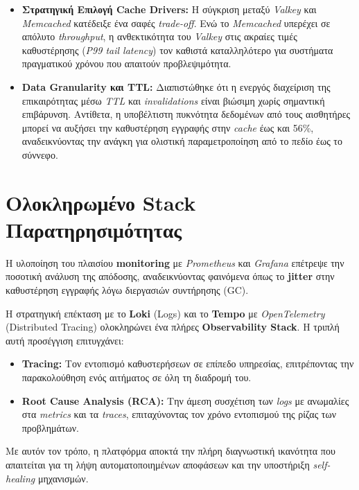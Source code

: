\begin{itemize}
	\item \textbf{Στρατηγική Επιλογή Cache Drivers:} Η σύγκριση μεταξύ
	      \textit{Valkey} και \textit{Memcached} κατέδειξε ένα σαφές
	      \textit{trade-off}. Ενώ το \textit{Memcached} υπερέχει σε
	      απόλυτο \textit{throughput}, η ανθεκτικότητα του
	      \textit{Valkey} στις ακραίες τιμές καθυστέρησης (\textit{P99
		      tail latency}) τον καθιστά καταλληλότερο για συστήματα
	      πραγματικού χρόνου που απαιτούν προβλεψιμότητα.
	\item \textbf{Data Granularity και TTL:} Διαπιστώθηκε ότι η ενεργός
	      διαχείριση της επικαιρότητας μέσω \textit{TTL} και
	      \textit{invalidations} είναι βιώσιμη χωρίς σημαντική
	      επιβάρυνση. Αντίθετα, η υποβέλτιστη πυκνότητα δεδομένων από
	      τους αισθητήρες μπορεί να αυξήσει την καθυστέρηση εγγραφής στην
	      \textit{cache} έως και 56\%, αναδεικνύοντας την ανάγκη για
	      ολιστική παραμετροποίηση από το πεδίο έως το σύννεφο.
\end{itemize}

\section{Ολοκληρωμένο Stack Παρατηρησιμότητας}

Η υλοποίηση του πλαισίου \textbf{monitoring} με \textit{Prometheus} και
\textit{Grafana} επέτρεψε την ποσοτική ανάλυση της απόδοσης, αναδεικνύοντας
φαινόμενα όπως το \textbf{jitter} στην καθυστέρηση εγγραφής λόγω διεργασιών
συντήρησης (GC).

Η στρατηγική επέκταση με το \textbf{Loki} (Logs) και το \textbf{Tempo} με
\textit{OpenTelemetry} (Distributed Tracing) ολοκληρώνει ένα πλήρες
\textbf{Observability Stack}. Η τριπλή αυτή προσέγγιση επιτυγχάνει:
\begin{itemize} \item \textbf{Tracing:} Τον εντοπισμό καθυστερήσεων σε επίπεδο
	      υπηρεσίας, επιτρέποντας την παρακολούθηση ενός αιτήματος σε όλη τη διαδρομή
	      του. \item \textbf{Root Cause Analysis (RCA):} Την άμεση συσχέτιση των
	      \textit{logs} με ανωμαλίες στα \textit{metrics} και τα \textit{traces},
	      επιταχύνοντας τον χρόνο εντοπισμού της ρίζας των προβλημάτων. \end{itemize} Με
αυτόν τον τρόπο, η πλατφόρμα αποκτά την πλήρη διαγνωστική ικανότητα που
απαιτείται για τη λήψη αυτοματοποιημένων αποφάσεων και την υποστήριξη
\textit{self-healing} μηχανισμών.

